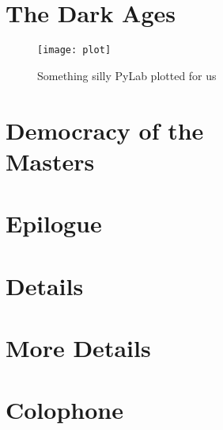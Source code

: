 \documentclass[11pt]{book}
\begin{document}
\chapter{The Dark Ages}
\lipsum[1-2]
\begin{figure}[t]
\centering
\texttt{[image: plot]}
\caption{Something silly PyLab plotted for us}
\end{figure}
\lipsum[3-8]

\chapter[Democracy of the Masters]{Democracy of the\\Masters}
\lipsum[1-10]

\chapter{Epilogue}
\blindmathpaper

\appendix

\chapter{Details}
\lipsum[2-5]

\chapter{More Details}
\lipsum[4-9]

\backmatter

\cleardoublepage
{}
{}
{}


\cleardoublepage
{}
{}
\printindex

\cleardoublepage
\chapter{Colophone}
\lipsum[2]
\end{document}
